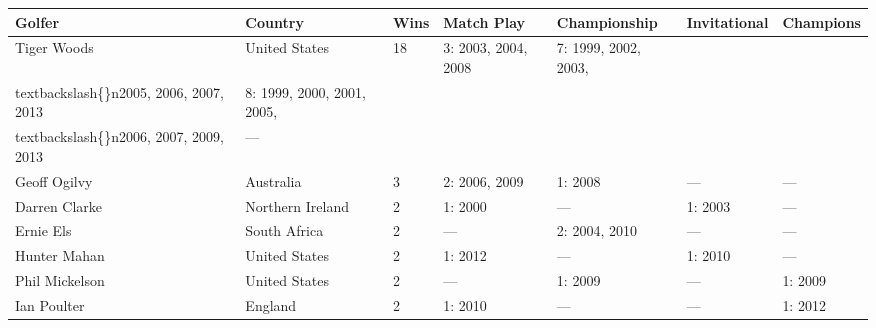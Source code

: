 \documentclass{article}
\begin{document}
\begin{tabular}{lllllll}
\toprule
Golfer & Country & Wins & Match Play & Championship & Invitational & Champions \\
\midrule
Tiger Woods & United States & 18 & 3: 2003, 2004, 2008 & 7: 1999, 2002, 2003,\\textbackslash\{\}n2005, 2006, 2007, 2013 & 8: 1999, 2000, 2001, 2005,\\textbackslash\{\}n2006, 2007, 2009, 2013 & — \\
Geoff Ogilvy & Australia & 3 & 2: 2006, 2009 & 1: 2008 & — & — \\
Darren Clarke & Northern Ireland & 2 & 1: 2000 & — & 1: 2003 & — \\
Ernie Els & South Africa & 2 & — & 2: 2004, 2010 & — & — \\
Hunter Mahan & United States & 2 & 1: 2012 & — & 1: 2010 & — \\
Phil Mickelson & United States & 2 & — & 1: 2009 & — & 1: 2009 \\
Ian Poulter & England & 2 & 1: 2010 & — & — & 1: 2012 \\
\bottomrule
\end{tabular}
\end{document}
